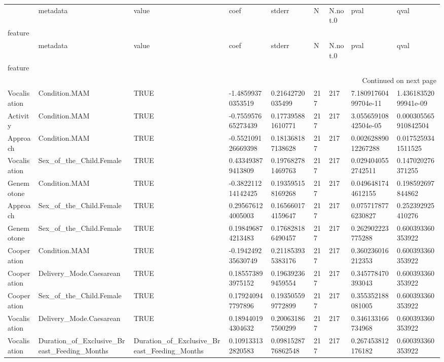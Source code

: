 \begin{longtable}{lllllllll}
\toprule
 & metadata & value & coef & stderr & N & N.not.0 & pval & qval \\
feature &  &  &  &  &  &  &  &  \\
\midrule
\endfirsthead
\toprule
 & metadata & value & coef & stderr & N & N.not.0 & pval & qval \\
feature &  &  &  &  &  &  &  &  \\
\midrule
\endhead
\midrule
\multicolumn{9}{r}{Continued on next page} \\
\midrule
\endfoot
\bottomrule
\endlastfoot
Vocalisation & Condition.MAM & TRUE & -1.48599370353519 & 0.21642720035499 & 217 & 217 & 7.18091760499704e-11 & 1.43618352099941e-09 \\
Activity & Condition.MAM & TRUE & -0.755957665273439 & 0.177395881610771 & 217 & 217 & 3.05565910842504e-05 & 0.000305565910842504 \\
Approach & Condition.MAM & TRUE & -0.552109126669398 & 0.181368187138628 & 217 & 217 & 0.00262889012267288 & 0.0175259341511525 \\
Vocalisation & Sex\_of\_the\_Child.Female & TRUE & 0.433493879413809 & 0.197682781469763 & 217 & 217 & 0.0294040552742511 & 0.147020276371255 \\
Genemotone & Condition.MAM & TRUE & -0.382211214142425 & 0.193595158169268 & 217 & 217 & 0.0496481744612155 & 0.198592697844862 \\
Approach & Sex\_of\_the\_Child.Female & TRUE & 0.295676124005003 & 0.165660174159647 & 217 & 217 & 0.0757178776230827 & 0.252392925410276 \\
Genemotone & Sex\_of\_the\_Child.Female & TRUE & 0.198496874213483 & 0.176828186490457 & 217 & 217 & 0.262902223775288 & 0.600393360353922 \\
Cooperation & Condition.MAM & TRUE & -0.194249235630749 & 0.211853935383176 & 217 & 217 & 0.360236016212353 & 0.600393360353922 \\
Cooperation & Delivery\_Mode.Caesarean & TRUE & 0.185573893975152 & 0.196392369459554 & 217 & 217 & 0.345778470393043 & 0.600393360353922 \\
Cooperation & Sex\_of\_the\_Child.Female & TRUE & 0.179240947797896 & 0.193505599772899 & 217 & 217 & 0.355352188081005 & 0.600393360353922 \\
Vocalisation & Delivery\_Mode.Caesarean & TRUE & 0.189440194304632 & 0.200631867500299 & 217 & 217 & 0.346133166734968 & 0.600393360353922 \\
Vocalisation & Duration\_of\_Exclusive\_Breast\_Feeding\_Months & Duration\_of\_Exclusive\_Breast\_Feeding\_Months & 0.109133132820583 & 0.0981528776862548 & 217 & 217 & 0.267453812176182 & 0.600393360353922 \\

\end{longtable}
